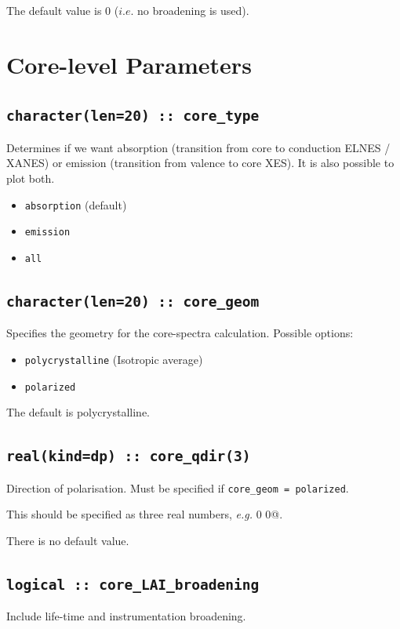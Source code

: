 \documentclass[a4paper,11pt,twoside]{book}
\begin{document}
{The default value is 0 ($i.e.$ no broadening is used).


\section{Core-level Parameters}

\subsection[core\_geom]{\tt character(len=20) :: core\_type}

Determines if we want absorption (transition from core to conduction
ELNES / XANES)
or emission (transition from valence to core XES). It is also possible
to plot both.
\begin{itemize}
\item[{\bf --}]  \verb#absorption# (default)
\item[{\bf --}]  \verb#emission#
\item[{\bf --}]  \verb#all#
\end{itemize}

\subsection[core\_geom]{\tt character(len=20) :: core\_geom}

Specifies the geometry for the core-spectra calculation.  Possible options:
\begin{itemize}
\item[{\bf --}]  \verb#polycrystalline# (Isotropic average)
\item[{\bf --}]  \verb#polarized#
\end{itemize}
The default is polycrystalline.

\subsection[core\_qdir]{\tt real(kind=dp) :: core\_qdir(3)}
Direction of polarisation. Must be specified if \verb#core_geom = polarized#.

This should be specified as three real numbers, \emph{e.g.}  0 0@.

There is no default value.

\subsection[core\_LAI\_broadening]{\tt logical :: core\_LAI\_broadening}
Include life-time and instrumentation broadening.

}
\end{document}
